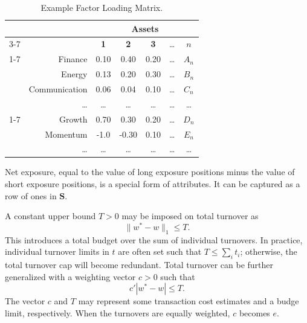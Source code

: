 \documentclass[11pt, letterpaper]{article}
\begin{document}
\begin{table}[t]
\label{example_attribute_matrix}
\centering
    \caption{Example Factor Loading Matrix.}
    \vspace{0.3cm}
    \begin{tabular}{cr *{5}{c}}
        \toprule
        & & \multicolumn{5}{c}{\textbf{Assets}} \\
        \cmidrule(lr){3-7}
        & & \textbf{1} & \textbf{2} & \textbf{3} & \dots & \textbf{$n$} \\
        \cmidrule(lr){1-7}
        & Finance & 0.10 & 0.40 & 0.20 & \dots & $A_n$ \\
        & Energy & 0.13 & 0.20 & 0.30 & \dots & $B_n$ \\
        & Communication & 0.06 & 0.04 & 0.10 & \dots & $C_n$ \\
        & \dots & \dots & \dots & \dots & \dots & \dots \\
        \cmidrule(lr){1-7}
        & Growth & 0.70 & 0.30 & 0.20 & \dots & $D_n$ \\
        & Momentum & -1.0 & -0.30 & 0.10 & \dots & $E_n$ \\
        & \dots & \dots & \dots & \dots & \dots & \dots \\
        \bottomrule
    \end{tabular}
\end{table}

Net exposure, equal to the value of long exposure positions minus the value of short exposure positions, is a special form of
attributes. It can be captured as a row of ones in $\mathbf{S}$.

A constant upper bound $T > 0$ may be imposed on total turnover as
\begin{equation}
    \label{unedited_total_turnover}
	\lVert w^* - w\rVert_1 \leq T.
\end{equation}
This introduces a total budget over the sum of individual turnovers. In practice, individual turnover limits in $t$ are often
set such that $T \leq \sum_i t_i$; otherwise, the total turnover cap will become redundant. Total turnover can be further generalized
with a weighting vector $c > 0$ such that
\begin{equation*}
	c' |w^* - w| \leq T.
\end{equation*}
The vector $c$ and $T$ may represent some transaction cost estimates and a budge limit, respectively. When the turnovers are
equally weighted, $c$ becomes $e$.
\end{document}
